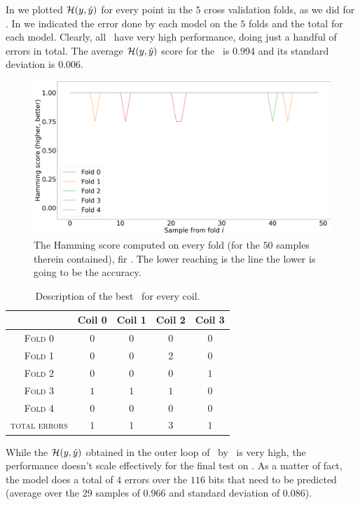 In  we plotted $\mathcal{H}(y, \hat{y})$ for every point in the $5$ cross validation folds, as we
did for \dts. In  we indicated the error done by each model on the $5$ folds and
the total for each model. Clearly, all \svcs\ have very high performance, doing just a handful of
errors in total. The average $\mathcal{H}(y, \hat{y})$ score for the \svc\ is $0.994$ and its standard deviation is $0.006$.
\begin{figure}
	\centering
	\includegraphics[width=\linewidth]{img/svc_qlp_hs.png}
	\caption{The Hamming score computed on every fold (for the $50$ samples therein contained),
	fir \svcs. The lower reaching is the line the lower is going to be the accuracy.}
	\label{fig:svc-qlp-hs}
\end{figure}
\begin{table}[!ht]
	\caption{Description of the best \rf\ for every coil.}\label{tbl:svc-err}

	\bigskip
	\setlength{\tabcolsep}{6pt}
	\centering
	\begin{tabular}{ccccc}
		\toprule
		\textbf{}                     & \textbf{Coil 0}    & \textbf{Coil 1} & \textbf{Coil 2} & \textbf{Coil 3}
		\\
		\midrule
		\textsc{Fold 0}         & $0$           & $0$           & $0$            & $0$            \\
		\textsc{Fold 1}         & $0$		& $0$		& $2$            & $0$		  \\
		\textsc{Fold 2}		& $0$           & $0$		& $0$            & $1$            \\
		\textsc{Fold 3}         & $1$           & $1$ 		& $1$            & $0$            \\
		\textsc{Fold 4}         & $0$		& $0$           & $0$            & $0$            \\
		\midrule
		\textsc{total errors}	& $1$		& $1$		& $3$		& $1$
		\\
		\bottomrule
	\end{tabular}
\end{table}

While the $\mathcal{H}(y, \hat{y})$ obtained in the outer loop of \ncv\ by \svcs\ is very high, the performance doesn't
scale effectively for the final test on \db. As a matter of fact, the model does a total of $4$
errors over the $116$ bits that need to be predicted (average over the $29$ samples of $0.966$ and
standard deviation of 0.086).






